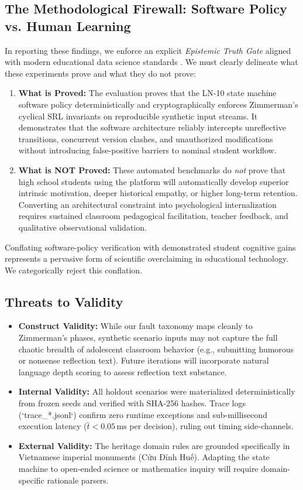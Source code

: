 \documentclass[11pt,a4paper]{article}
\begin{document}
\subsection{The Methodological Firewall: Software Policy vs. Human Learning}
In reporting these findings, we enforce an explicit \textit{Epistemic Truth Gate} aligned with modern educational data science standards \cite{baker2008gaming}. We must clearly delineate what these experiments prove and what they do not prove:

\begin{enumerate}
    \item \textbf{What is Proved:} The evaluation proves that the LN-10 state machine software policy deterministically and cryptographically enforces Zimmerman's cyclical SRL invariants on reproducible synthetic input streams. It demonstrates that the software architecture reliably intercepts unreflective transitions, concurrent version clashes, and unauthorized modifications without introducing false-positive barriers to nominal student workflow.
    \item \textbf{What is NOT Proved:} These automated benchmarks do \textit{not} prove that high school students using the platform will automatically develop superior intrinsic motivation, deeper historical empathy, or higher long-term retention. Converting an architectural constraint into psychological internalization requires sustained classroom pedagogical facilitation, teacher feedback, and qualitative observational validation.
\end{enumerate}

Conflating software-policy verification with demonstrated student cognitive gains represents a pervasive form of scientific overclaiming in educational technology. We categorically reject this conflation.

\subsection{Threats to Validity}
\begin{itemize}
    \item \textbf{Construct Validity:} While our fault taxonomy maps cleanly to Zimmerman's phases, synthetic scenario inputs may not capture the full chaotic breadth of adolescent classroom behavior (e.g., submitting humorous or nonsense reflection text). Future iterations will incorporate natural language depth scoring to assess reflection text substance.
    \item \textbf{Internal Validity:} All holdout scenarios were materialized deterministically from frozen seeds and verified with SHA-256 hashes. Trace logs (`trace_*.jsonl`) confirm zero runtime exceptions and sub-millisecond execution latency ($\bar{t} < 0.05\,\text{ms}$ per decision), ruling out timing side-channels.
    \item \textbf{External Validity:} The heritage domain rules are grounded specifically in Vietnamese imperial monuments (Cửu Đỉnh Huế). Adapting the state machine to open-ended science or mathematics inquiry will require domain-specific rationale parsers.
\end{itemize}
\end{document}
